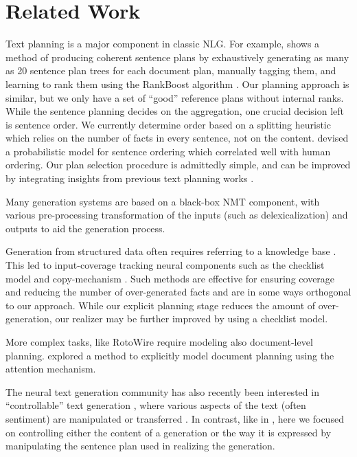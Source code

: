 \documentclass[11pt,a4paper]{article}
\begin{document}
\section{Related Work}\label{sec:related}
Text planning is a major component in classic NLG. For example, \citet{stent2004trainable} shows a method of producing coherent sentence plans by exhaustively generating as many as 20 sentence plan trees for each document plan, manually tagging them, and learning to rank them using the RankBoost algorithm \cite{schapire1999brief}. Our planning approach is similar, but we only have a set of ``good'' reference plans without internal ranks. While the sentence planning decides on the aggregation, one crucial decision left is sentence order. We currently determine order based on a splitting heuristic which relies on the number of facts in every sentence, not on the content. \citet{lapata2003probabilistic} devised a probabilistic model for sentence ordering which correlated well with human ordering. Our plan selection procedure is admittedly simple, and can be improved by integrating insights from previous text planning works \cite{barzilay2006aggregation, konstas2012unsupervised, konstas2013inducing}.

Many generation systems \cite{gardent2017webnlg, duvsek2018findings} are based on a black-box NMT component, with various pre-processing transformation of the inputs (such as delexicalization) and outputs to aid the generation process.

Generation from structured data often requires referring to a knowledge base \cite{mei2015talk, kiddon2016globally, wen2015semantically}.
This led to input-coverage tracking neural components such as the checklist model \cite{kiddon2016globally} and copy-mechanism \cite{gulcehre2016pointing}. Such methods are effective for ensuring coverage and reducing the number of over-generated facts and are in some ways orthogonal to our approach. While our explicit planning stage reduces the amount of over-generation, our realizer may be further improved by using a checklist model.


More complex tasks, like RotoWire \cite{wiseman2017challenges} require modeling also document-level planning. \citet{puduppully2018data} explored a method to explicitly model document planning using the attention mechanism.

The neural text generation community has also recently been interested in ``controllable'' text generation \cite{hu2017toward}, where various aspects of the text (often sentiment) are manipulated \cite{ficler2017controlling} or transferred \cite{shen2017style, zhao2018adversarially, li2018delete}. In contrast, like in \cite{wiseman2018learning}, here we focused on controlling either the content of a generation or the way it is expressed by manipulating the sentence plan used in realizing the generation.
\end{document}
